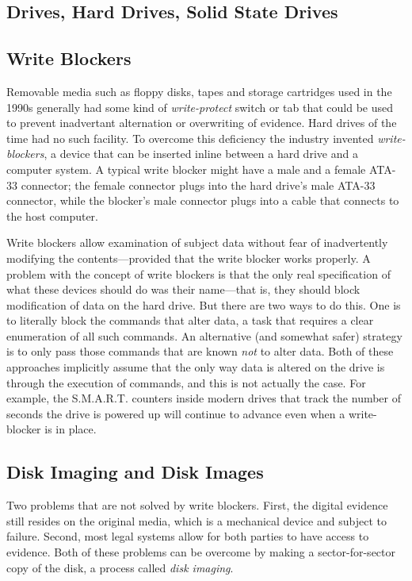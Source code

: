 \subsection{Drives, Hard Drives, Solid State Drives}

\subsection{Write Blockers}

Removable media such as floppy disks, tapes and storage cartridges
used in the 1990s generally had some kind of \emph{write-protect}
switch or tab that could be used to prevent inadvertant alternation or
overwriting of evidence. Hard drives of the time had no such
facility. To overcome this deficiency the industry invented
\emph{write-blockers}, a device that can be inserted inline between a
hard drive and a computer system. A typical write blocker might have a
male and a female ATA-33 connector; the female connector plugs into
the hard drive's male ATA-33 connector, while the blocker's male
connector plugs into a cable that connects to the host computer.

Write blockers allow examination of subject data without fear of
inadvertently modifying the contents---provided that the write blocker
works properly. A problem with the concept of write blockers is that
the only real specification of what these devices should do was their
name---that is, they should block modification of data on the hard
drive.  But there
are two ways to do this. One is to literally block the commands that
alter data, a task that requires a clear enumeration of all such
commands. An alternative (and somewhat safer) strategy is to only pass
those commands that are known \emph{not} to alter
data\cite{dfrws2006:JamesLyle}. Both of these approaches
implicitly assume that the only way data is altered on the drive is
through the execution of commands, and this is not actually the
case. For example, the S.M.A.R.T. counters inside modern drives that
track the number of seconds the drive is powered up will continue to
advance even when a write-blocker is in place.

\subsection{Disk Imaging and Disk Images}
Two problems that are not solved by write blockers. First, the
digital evidence still resides on the original media, which is a
mechanical device and subject to failure. Second, most legal systems
allow for both parties to have access to evidence. Both of these
problems can be overcome by making a sector-for-sector copy of the
disk, a process called \emph{disk imaging}.

